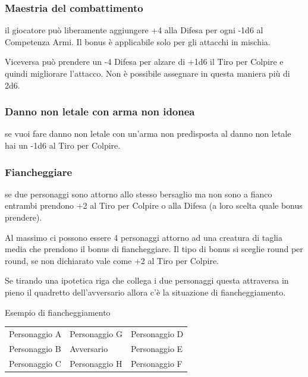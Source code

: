 \documentclass[a4paper,11pt,twoside,openany]{book}
\begin{document}
\subsubsection{Maestria del combattimento} il giocatore può liberamente aggiungere +4 alla Difesa per ogni -1d6 al Competenza Armi. Il bonus è applicabile solo per gli attacchi in mischia.

Viceversa può prendere un -4 Difesa per alzare di +1d6 il Tiro per Colpire e quindi migliorare l'attacco. Non è possibile assegnare in questa maniera più di 2d6.

\subsubsection{Danno non letale con arma non idonea} se vuoi fare danno non letale con un'arma non predisposta al danno non letale hai un -1d6 al Tiro per Colpire.

\subsubsection{Fiancheggiare} se due personaggi sono attorno allo stesso bersaglio ma non sono a fianco entrambi prendono +2 al Tiro per Colpire o alla Difesa (a loro scelta quale bonus prendere).

Al massimo ci possono essere 4 personaggi attorno ad una creatura di taglia media che prendono il bonus di fiancheggiare. Il tipo di bonus si sceglie round per round, se non dichiarato vale come +2 al Tiro per Colpire.

Se tirando una ipotetica riga che collega i due personaggi questa attraversa in pieno il quadretto dell'avversario allora c'è la situazione di fiancheggiamento.

\bigskip

Esempio di fiancheggiamento

\medskip

\begin{tabularx}{\textwidth}{XXX}
	\toprule
	Personaggio A & Personaggio G & Personaggio D\tabularnewline
	Personaggio B & Avversario    & Personaggio E\tabularnewline
	Personaggio C & Personaggio H & Personaggio F\tabularnewline
\end{tabularx}

\bigskip
\end{document}
